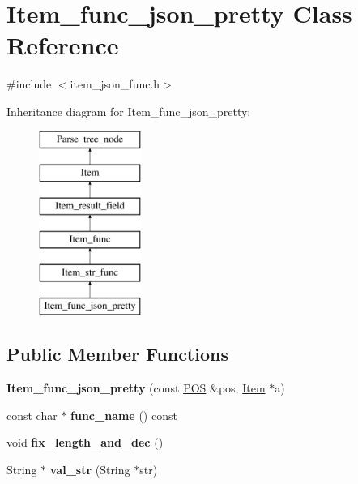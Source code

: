 \hypertarget{classItem__func__json__pretty}{}\section{Item\+\_\+func\+\_\+json\+\_\+pretty Class Reference}
\label{classItem__func__json__pretty}


{\ttfamily \#include $<$item\+\_\+json\+\_\+func.\+h$>$}

Inheritance diagram for Item\+\_\+func\+\_\+json\+\_\+pretty\+:\begin{figure}[H]
\begin{center}
\leavevmode
\includegraphics[height=6.000000cm]{classItem__func__json__pretty}
\end{center}
\end{figure}
\subsection*{Public Member Functions}
\begin{DoxyCompactItemize}
\item 
\mbox{\label{classItem__func__json__pretty_aacaa1aaa1d54b204ad95b7b4480215d7}} 
{\bfseries Item\+\_\+func\+\_\+json\+\_\+pretty} (const \mbox{\hyperlink{structYYLTYPE}{P\+OS}} \&pos, \mbox{\hyperlink{classItem}{Item}} $\ast$a)
\item 
\mbox{\label{classItem__func__json__pretty_a367cda5b66c1970ae295be3ed87fb4a8}} 
const char $\ast$ {\bfseries func\+\_\+name} () const
\item 
\mbox{\label{classItem__func__json__pretty_ac61adc025b09d1cef2929f32ac60af52}} 
void {\bfseries fix\+\_\+length\+\_\+and\+\_\+dec} ()
\item 
\mbox{\label{classItem__func__json__pretty_aa9b9c038d7fd26dc650890373a002d32}} 
String $\ast$ {\bfseries val\+\_\+str} (String $\ast$str)
\end{DoxyCompactItemize}
